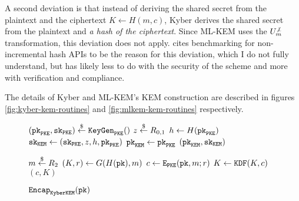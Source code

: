\documentclass{article}
\begin{document}
A second deviation is that instead of deriving the shared secret from the plaintext and the ciphertext $K \leftarrow H(m, c)$, Kyber derives the shared secret from the plaintext and \emph{a hash of the ciphertext}. Since ML-KEM uses the $U^{\not\bot}_m$ transformation, this deviation does not apply. \cite{bos2018crystals} cites benchmarking for non-incremental hash APIs to be the reason for this deviation, which I do not fully understand, but has likely less to do with the security of the scheme and more with verification and compliance.

The details of Kyber and ML-KEM's KEM construction are described in figures \ref{fig:kyber-kem-routines} and \ref{fig:mlkem-kem-routines} respectively.

\begin{figure}[H]
    \begin{minipage}{0.3\textwidth}
        \begin{algorithm}[H]
            \caption{$\keygen_\monospace{KyberKEM}$}\label{alg:kyber-kem-keygen}
            \begin{algorithmic}[1]
                \State $(\texttt{pk}_\texttt{PKE}, \texttt{sk}_\texttt{PKE}) \stackrel{\$}{\leftarrow} \texttt{KeyGen}_\texttt{PKE}()$
                \State $z \stackrel{\$}{\leftarrow} R_{0,1}$
                \State $h \leftarrow H(\texttt{pk}_\texttt{PKE})$
                \State $\texttt{sk}_\texttt{KEM} \leftarrow (\texttt{sk}_\texttt{PKE}, z, h, \texttt{pk}_\texttt{PKE})$
                \State $\texttt{pk}_\texttt{KEM} \leftarrow \texttt{pk}_\texttt{PKE}$
                \State \Return $(\texttt{pk}_\texttt{KEM}, \texttt{sk}_\texttt{KEM})$
            \end{algorithmic}
        \end{algorithm}
    \end{minipage}
    \hfill
    \begin{minipage}{0.33\textwidth}
        \begin{algorithm}[H]
            \caption{$\texttt{Encap}_\texttt{KyberKEM}(\texttt{pk})$}\label{alg:kyber-kem-encap}
            \begin{algorithmic}[1]
                \State $m \stackrel{\$}{\leftarrow} R_2$
                \State $(K, r) \leftarrow G(H(\texttt{pk}), m)$
                \State $c \leftarrow \texttt{E}_\texttt{PKE}(\texttt{pk}, m; r)$
                \State $K \leftarrow \texttt{KDF}(K, c)$
                \State \Return $(c, K)$
            \end{algorithmic}
        \end{algorithm}
    \end{minipage}
    \hfill
    \begin{minipage}{0.33\textwidth}
        \begin{algorithm}[H]

\end{algorithm}
\end{minipage}
\end{figure}
\end{document}
